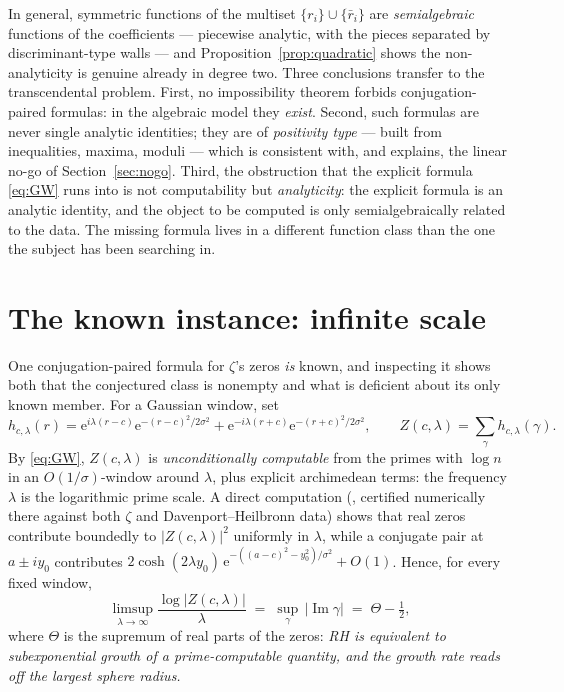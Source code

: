 \documentclass[11pt]{amsart}
\theoremstyle{definition}
\theoremstyle{remark}
\newcommand{\eE}{\mathrm{e}}
\DeclareMathOperator{\Iim}{Im}
\begin{document}
In general, symmetric functions of the multiset $\{r_i\}\cup\{\bar r_i\}$ are \emph{semialgebraic} functions of the coefficients --- piecewise analytic, with the pieces separated by discriminant-type walls --- and Proposition~\ref{prop:quadratic} shows the non-analyticity is genuine already in degree two. Three conclusions transfer to the transcendental problem. First, no impossibility theorem forbids conjugation-paired formulas: in the algebraic model they \emph{exist}. Second, such formulas are never single analytic identities; they are of \emph{positivity type} --- built from inequalities, maxima, moduli --- which is consistent with, and explains, the linear no-go of Section~\ref{sec:nogo}. Third, the obstruction that the explicit formula \eqref{eq:GW} runs into is not computability but \emph{analyticity}: the explicit formula is an analytic identity, and the object to be computed is only semialgebraically related to the data. The missing formula lives in a different function class than the one the subject has been searching in.

\section{The known instance: infinite scale}\label{sec:degenerate}

One conjugation-paired formula for $\zeta$'s zeros \emph{is} known, and inspecting it shows both that the conjectured class is nonempty and what is deficient about its only known member. For a Gaussian window, set
\[
h_{c,\lambda}(r)=\eE^{i\lambda(r-c)}\eE^{-(r-c)^2/2\sigma^2}+\eE^{-i\lambda(r+c)}\eE^{-(r+c)^2/2\sigma^2},
\qquad
Z(c,\lambda)=\sum_\gamma h_{c,\lambda}(\gamma).
\]
By \eqref{eq:GW}, $Z(c,\lambda)$ is \emph{unconditionally computable} from the primes with $\log n$ in an $O(1/\sigma)$-window around $\lambda$, plus explicit archimedean terms: the frequency $\lambda$ is the logarithmic prime scale. A direct computation (\cite{ZS}, certified numerically there against both $\zeta$ and Davenport--Heilbronn data) shows that real zeros contribute boundedly to $|Z(c,\lambda)|^2$ uniformly in $\lambda$, while a conjugate pair at $a\pm iy_0$ contributes $2\cosh(2\lambda y_0)\,\eE^{-((a-c)^2-y_0^2)/\sigma^2}+O(1)$. Hence, for every fixed window,
\begin{equation}\label{eq:limsup}
\limsup_{\lambda\to\infty}\frac{\log|Z(c,\lambda)|}{\lambda}\;=\;\sup_\gamma\,|\!\Iim\gamma|\;=\;\Theta-\tfrac12,
\end{equation}
where $\Theta$ is the supremum of real parts of the zeros: \emph{RH is equivalent to subexponential growth of a prime-computable quantity, and the growth rate reads off the largest sphere radius.}
\end{document}
